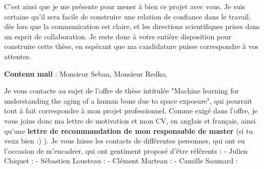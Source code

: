 \documentclass[a4paper,12pt]{article}
\begin{document}
C'est ainsi que je me présente pour mener à bien ce projet avec vous. Je suis certaine qu'il sera facile de construire une relation de confiance dans le travail, dès lors que la communication est claire, et les directions scientifiques prises dans un esprit de collaboration. Je reste donc à votre entière disposition pour construire cette thèse, en espérant que ma candidature puisse correspondre à vos attentes. 



\hspace{3cm}

\textbf{Contenu mail} : Monsieur Seban, Monsieur Redko, 

Je vous contacte au sujet de l'offre de thèse intitulée "Machine learning for understanding the aging of a human bone due to space exposure", qui pourrait tout à fait correspondre à mon projet professionnel. Comme exigé dans l'offre, je vous joins donc ma lettre de motivation et mon CV, en anglais et français, ainsi qu'une \textbf{lettre de recommandation de mon responsable de master} (si tu veux bien :) ).%
Je vous laisse les contacts de différentes personnes, qui ont eu l'occasion de m'encadrer, qui ont gentiment proposé d'être référents : 
- Julien Chiquet : 
- Sébastien Lousteau :
- Clément Marteau : 
- Camille Saumard : 
\end{document}
